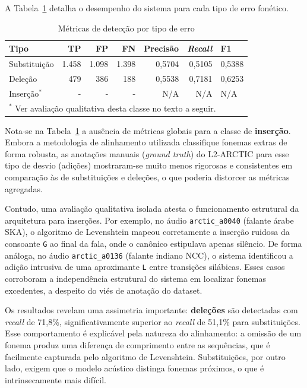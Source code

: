 \documentclass[12pt]{article}
\begin{document}
A Tabela~\ref{tab:tipo_erro} detalha o desempenho do sistema para cada tipo de erro fonético.

\begin{table}[H]
\centering
\caption{Métricas de detecção por tipo de erro}
\label{tab:tipo_erro}
\begin{tabular}{@{}lrrrrrl@{}}
\toprule
\textbf{Tipo} & \textbf{TP} & \textbf{FP} & \textbf{FN} & \textbf{Precisão} & \textbf{\textit{Recall}} & \textbf{F1} \\
\midrule
Substituição & 1.458 & 1.098 & 1.398 & 0,5704 & 0,5105 & 0,5388 \\
Deleção      & 479   & 386   & 188   & 0,5538 & 0,7181 & 0,6253 \\
Inserção$^*$ & - & - & - & N/A & N/A & N/A \\
\bottomrule
\multicolumn{7}{l}{\small $^*$ Ver avaliação qualitativa desta classe no texto a seguir.}
\end{tabular}
\end{table}

Nota-se na Tabela~\ref{tab:tipo_erro} a ausência de métricas globais para a classe de \textbf{inserção}. Embora a metodologia de alinhamento utilizada classifique fonemas extras de forma robusta, as anotações manuais (\textit{ground truth}) do L2-ARCTIC para esse tipo de desvio (adições) mostraram-se muito menos rigorosas e consistentes em comparação às de substituições e deleções, o que poderia distorcer as métricas agregadas.

Contudo, uma avaliação qualitativa isolada atesta o funcionamento estrutural da arquitetura para inserções. Por exemplo, no áudio \texttt{arctic\_a0040} (falante árabe SKA), o algoritmo de Levenshtein mapeou corretamente a inserção ruidosa da consoante \texttt{G} ao final da fala, onde o canônico estipulava apenas silêncio. De forma análoga, no áudio \texttt{arctic\_a0136} (falante indiano NCC), o sistema identificou a adição intrusiva de uma aproximante \texttt{L} entre transições silábicas. Esses casos corroboram a independência estrutural do sistema em localizar fonemas excedentes, a despeito do viés de anotação do dataset.

Os resultados revelam uma assimetria importante: \textbf{deleções} são detectadas com \textit{recall} de 71,8\%, significativamente superior ao \textit{recall} de 51,1\% para substituições. Esse comportamento é explicável pela natureza do alinhamento: a omissão de um fonema produz uma diferença de comprimento entre as sequências, que é facilmente capturada pelo algoritmo de Levenshtein. Substituições, por outro lado, exigem que o modelo acústico distinga fonemas próximos, o que é intrinsecamente mais difícil.
\end{document}
